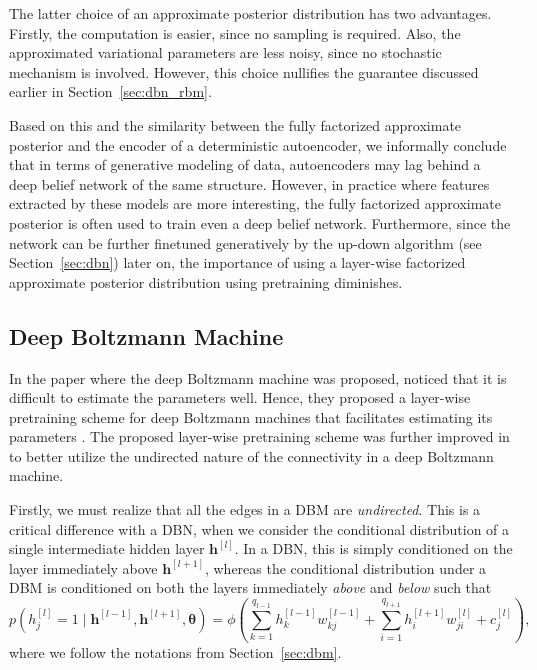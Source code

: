 \documentclass{now}
\newcommand{\qlay}[1]{\left[#1\right]}
\newcommand{\vect}[1]{\mathbf{#1}}
\newcommand{\vects}[1]{\boldsymbol{#1}}
\newcommand{\vh}[0]{\vect{h}}
\newcommand{\TT}[0]{{\vects{\theta}}}
\begin{document}
The latter choice of an approximate posterior distribution has
two advantages. Firstly, the computation is easier, since no
sampling is required. Also, the approximated variational
parameters are less noisy, since no stochastic mechanism is
involved. However, this choice nullifies the guarantee discussed
earlier in Section~\ref{sec:dbn_rbm}.

Based on this and the similarity between the fully
factorized approximate posterior and the encoder of a
deterministic autoencoder, we informally conclude that in
terms of generative modeling of data, autoencoders may lag
behind a deep belief network of the same structure. However,
in practice where features extracted by these models are
more interesting, the fully factorized approximate posterior
is often used to train even a deep belief network.
Furthermore, since the network can be further finetuned
generatively by the up-down algorithm (see
Section~\ref{sec:dbn}) later on, the importance of using a
layer-wise factorized approximate posterior distribution
using pretraining diminishes.



\subsection{Deep Boltzmann Machine}
\label{sec:dbm_pre}

In the paper where the deep Boltzmann machine was proposed,
\citet{Salakhutdinov2009a} noticed that it is difficult to
estimate the parameters well. Hence, they proposed a
layer-wise pretraining scheme for deep Boltzmann machines
that facilitates estimating its parameters
\citep{Salakhutdinov2012nc}. The proposed layer-wise
pretraining scheme was further improved in
\citep{Salakhutdinov2012} to better utilize the undirected
nature of the connectivity in a deep Boltzmann machine.

Firstly, we must realize that all the edges in a DBM are
\textit{undirected}. This is a critical difference with a
DBN, when we consider the conditional distribution of a
single intermediate hidden layer $\vh^{\qlay{l}}$. In a DBN, this
is simply conditioned on the layer immediately above
$\vh^{\qlay{l+1}}$, whereas the conditional distribution under a
DBM is conditioned on both the layers immediately
\textit{above} and \textit{below} such that
\[
p(h^{\qlay{l}}_j = 1 \mid \vh^{\qlay{l-1}}, \vh^{\qlay{l+1}}, \TT) = \phi\left(
\sum_{k=1}^{q_{l-1}} h^{\qlay{l-1}}_k w_{kj}^{\qlay{l-1}} +
\sum_{i=1}^{q_{l+1}} h^{\qlay{l+1}}_i w_{ji}^{\qlay{l}} +
c_j^{\qlay{l}}
\right),
\]
where we follow the notations from Section~\ref{sec:dbm}.
\end{document}

